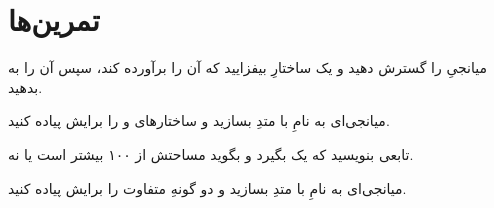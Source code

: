 \section{تمرین‌ها}

\exercise میانجیِ  را گسترش دهید و یک ساختارِ  بیفزایید که
آن را برآورده کند، سپس آن را به  بدهید.

\exercise میانجی‌ای به نامِ  با متدِ  بسازید و
ساختارهای  و  را برایش پیاده کنید.

\exercise تابعی بنویسید که یک  بگیرد و بگوید مساحتش از ۱۰۰ بیشتر
است یا نه.

\exercise میانجی‌ای به نامِ  با متدِ  بسازید و
دو گونهِ متفاوت را برایش پیاده کنید.
